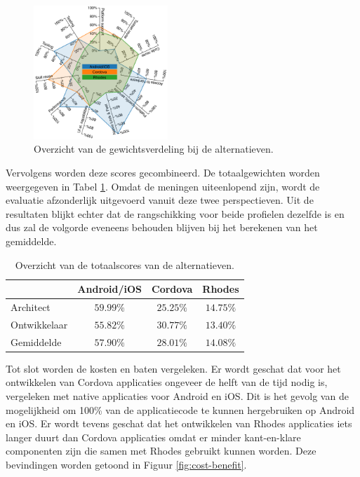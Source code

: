 \documentclass[a4paper]{IEEEconf}
\begin{document}
\begin{figure}[h!]
    \centering
    \includegraphics[width=0.45\textwidth]{../resources/figs/priority_radar.pdf}
    \caption{Overzicht van de gewichtsverdeling bij de alternatieven.}
    \label{fig:alternatives_radar}
\end{figure}

Vervolgens worden deze scores gecombineerd. De totaalgewichten worden weergegeven in Tabel \ref{tab:summary}. Omdat de meningen uiteenlopend zijn, wordt de evaluatie afzonderlijk uitgevoerd vanuit deze twee perspectieven. Uit de resultaten blijkt echter dat de rangschikking voor beide profielen dezelfde is en dus zal de volgorde eveneens behouden blijven bij het berekenen van het gemiddelde.

\begin{table}[h!]
    \centering
    \begin{tabular}{lccc}
        \hline
                     & Android/iOS & Cordova   & Rhodes    \\
        \hline
        Architect    & $59.99\%$   & $25.25\%$ & $14.75\%$ \\           
        Ontwikkelaar & $55.82\%$   & $30.77\%$ & $13.40\%$ \\
        \hline
        Gemiddelde   & $57.90\%$   & $28.01\%$ & $14.08\%$ \\
        \hline
    \end{tabular}
    \caption{Overzicht van de totaalscores van de alternatieven.}
    \label{tab:summary}
\end{table}

Tot slot worden de kosten en baten vergeleken. Er wordt geschat dat voor het ontwikkelen van Cordova applicaties ongeveer de helft van de tijd nodig is, vergeleken met native applicaties voor Android en iOS. Dit is het gevolg van de mogelijkheid om 100\% van de applicatiecode te kunnen hergebruiken op Android en iOS. Er wordt tevens geschat dat het ontwikkelen van Rhodes applicaties iets langer duurt dan Cordova applicaties omdat er minder kant-en-klare componenten zijn die samen met Rhodes gebruikt kunnen worden. Deze bevindingen worden getoond in Figuur \ref{fig:cost-benefit}.
\end{document}
